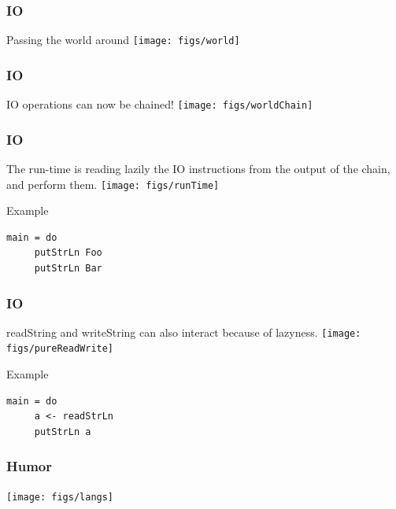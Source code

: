 \documentclass{beamer}
\begin{document}
\begin{frame}
\frametitle{IO}
 Passing the world around 
 \texttt{[image: figs/world]}
\end{frame}

\begin{frame}
\frametitle{IO}
 IO operations can now be chained!
 \texttt{[image: figs/worldChain]}

\end{frame}

\begin{frame}[fragile]
\frametitle{IO}
 The run-time is reading lazily the IO instructions from the output of the chain, and perform them.
 \texttt{[image: figs/runTime]}
 \begin{block}{Example}
  \begin{lstlisting}[basicstyle=\small]
   main = do
     putStrLn Foo
     putStrLn Bar
  \end{lstlisting}
 \end{block}

\end{frame}

\begin{frame}[fragile]
\frametitle{IO}
 readString and writeString can also interact because of lazyness.
 \vspace{0.5cm}
 \texttt{[image: figs/pureReadWrite]}
 \vspace{0.5cm}
 \begin{block}{Example}
  \begin{lstlisting}[basicstyle=\small]
   main = do
     a <- readStrLn
     putStrLn a
  \end{lstlisting}
 \end{block}
\end{frame}

\begin{frame}
\frametitle{Humor}
 \texttt{[image: figs/langs]}
\end{frame}

%
%  
% 
%  
%
% 


\end{document}
